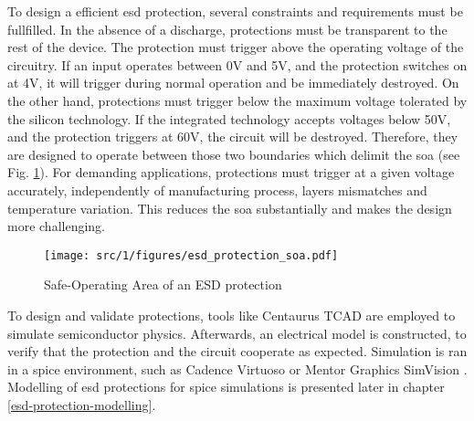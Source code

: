 
To design a efficient \gls{esd} protection, several constraints and requirements must be fullfilled.
In the absence of a discharge, protections must be transparent to the rest of the device.
The protection must trigger above the operating voltage of the circuitry.
If an input operates between 0V and 5V, and the protection switches on at 4V, it will trigger during normal operation and be immediately destroyed.
On the other hand, protections must trigger below the maximum voltage tolerated by the silicon technology.
If the integrated technology accepts voltages below 50V, and the protection triggers at 60V, the circuit will be destroyed.
Therefore, they are designed to operate between those two boundaries which delimit the \gls{soa} (see Fig. \ref{fig:soa-esd-protection}).
For demanding applications, protections must trigger at a given voltage accurately, independently of manufacturing process, layers mismatches and temperature variation.
This reduces the \gls{soa} substantially and makes the design more challenging.

\begin{figure}[!h]
  \centering
  \texttt{[image: src/1/figures/esd\_protection\_soa.pdf]}
  \caption{Safe-Operating Area of an ESD protection}
  \label{fig:soa-esd-protection}
\end{figure}

To design and validate protections, tools like Centaurus TCAD \cite{TODO} are employed to simulate semiconductor physics.
Afterwards, an electrical model is constructed, to verify that the protection and the circuit cooperate as expected.
Simulation is ran in a \gls{spice} environment, such as Cadence Virtuoso \cite{TODO} or Mentor Graphics SimVision \cite{TODO}.
Modelling of \gls{esd} protections for \gls{spice} simulations is presented later in chapter \ref{esd-protection-modelling}.
